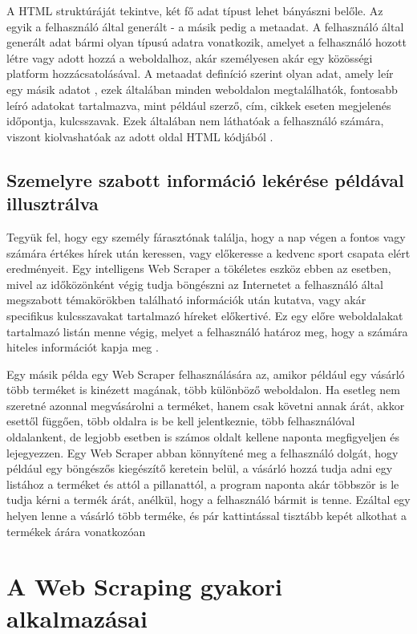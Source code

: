 A HTML struktúráját tekintve, két fő adat típust lehet bányászni belőle. Az egyik a felhasználó által generált - a másik pedig a metaadat. A felhasználó által generált adat bármi olyan típusú adatra vonatkozik, amelyet a felhasználó hozott létre vagy adott hozzá a weboldalhoz, akár személyesen akár egy közösségi platform hozzácsatolásával. A metaadat definíció szerint olyan adat, amely leír egy másik adatot \cite{landers2016primer}, ezek általában minden weboldalon megtalálhatók, fontosabb leíró adatokat tartalmazva, mint például szerző, cím, cikkek eseten megjelenés időpontja, kulcsszavak. Ezek általában nem láthatóak a felhasználó számára, viszont kiolvashatóak az adott oldal HTML kódjából \cite{landers2016primer}.

\subsection{Szemelyre szabott információ lekérése példával illusztrálva}

Tegyük fel, hogy egy személy fárasztónak találja, hogy a nap végen a fontos vagy számára értékes hírek után keressen, vagy előkeresse a kedvenc sport csapata elért eredményeit. Egy intelligens Web Scraper a tökéletes eszköz ebben az esetben, mivel az időközönként végig tudja böngészni az Internetet a felhasználó által megszabott témakörökben található információk után kutatva, vagy akár specifikus kulcsszavakat tartalmazó híreket előkertivé. Ez egy előre weboldalakat tartalmazó listán menne végig, melyet a felhasználó határoz meg, hogy a számára hiteles információt kapja meg \cite{dastidar2016intelligent}.

Egy másik példa egy Web Scraper felhasználására az, amikor például egy vásárló több terméket is kinézett magának, több különböző weboldalon. Ha esetleg nem szeretné azonnal megvásárolni a terméket, hanem csak követni annak árát, akkor esettől függően, több oldalra is be kell jelentkeznie, több felhasználóval oldalankent, de legjobb esetben is számos oldalt kellene naponta megfigyeljen és lejegyezzen. Egy Web Scraper abban könnyítené meg a felhasználó dolgát, hogy például egy böngészős kiegészítő keretein belül, a vásárló hozzá tudja adni egy listához a terméket és attól a pillanattól, a program naponta akár többször is le tudja kérni a termék árát, anélkül, hogy a felhasználó bármit is tenne. Ezáltal egy helyen lenne a vásárló több terméke, és pár kattintással tisztább kepét alkothat a termékek árára vonatkozóan

\section{A Web Scraping gyakori alkalmazásai}

